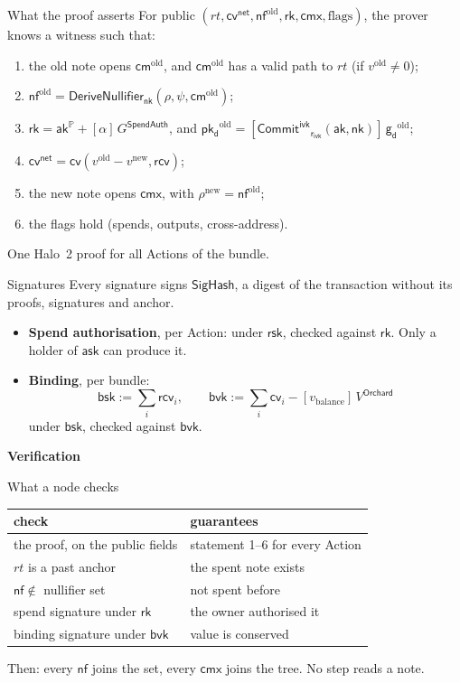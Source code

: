 \documentclass[aspectratio=169,11pt]{beamer}
\newcommand{\nfsym}{\ensuremath{\mathsf{nf}}}
\newcommand{\cmsym}{\ensuremath{\mathsf{cm}}}
\newcommand{\cmx}{\ensuremath{\mathsf{cmx}}}
\newcommand{\cvsym}{\ensuremath{\mathsf{cv}}}
\newcommand{\rksym}{\ensuremath{\mathsf{rk}}}
\newcommand{\gd}{\ensuremath{\mathsf{g_d}}}
\newcommand{\pkd}{\ensuremath{\mathsf{pk_d}}}
\newcommand{\aksym}{\ensuremath{\mathsf{ak}}}
\newcommand{\nksym}{\ensuremath{\mathsf{nk}}}
\newcommand{\asksym}{\ensuremath{\mathsf{ask}}}
\newcommand{\rcv}{\ensuremath{\mathsf{rcv}}}
\newcommand{\rivk}{\ensuremath{\mathsf{r_{ivk}}}}
\newcommand{\rsk}{\ensuremath{\mathsf{rsk}}}
\newcommand{\CommitIvk}{\ensuremath{\mathsf{Commit}^{\mathsf{ivk}}}}
\newcommand{\vbal}{\ensuremath{v_{\mathrm{balance}}}}
\newcommand{\divider}[1]{\begin{frame}[plain]\vfill\centering
  {\usebeamercolor[fg]{structure}\Huge\bfseries #1}\vfill\end{frame}}
\newcommand{\PP}{\mathbb{P}}
\newcommand{\akP}{\aksym^{\PP}}
\newcommand{\rk}{\rksym}
\newcommand{\DNf}{\mathsf{DeriveNullifier}}
\newcommand{\VO}{V^{\mathsf{Orchard}}}
\newcommand{\GS}{G^{\mathsf{SpendAuth}}}
\newcommand{\cvnet}{\cvsym^{\mathsf{net}}}
\begin{document}
\begin{frame}{What the proof asserts}
For public $(\mathit{rt}, \cvnet, \nfsym^{\mathrm{old}}, \rk, \cmx,
\text{flags})$,
the prover knows a witness such that:
\begin{enumerate}\itemsep3pt
\item the old note opens $\cmsym^{\mathrm{old}}$, and $\cmsym^{\mathrm{old}}$
  has a valid path to $\mathit{rt}$ (if $v^{\mathrm{old}} \ne 0$);
\item $\nfsym^{\mathrm{old}} = \DNf_{\nksym}(\rho, \psi,
  \cmsym^{\mathrm{old}})$;
\item $\rk = \akP + [\alpha]\,\GS$, and $\pkd^{\mathrm{old}} =
  [\CommitIvk_{\rivk}(\aksym, \nksym)]\,\gd^{\mathrm{old}}$;
\item $\cvnet = \cvsym(v^{\mathrm{old}} - v^{\mathrm{new}}, \rcv)$;
\item the new note opens $\cmx$, with $\rho^{\mathrm{new}} =
  \nfsym^{\mathrm{old}}$;
\item the flags hold (spends, outputs, cross-address).
\end{enumerate}
\vfill
One Halo~2 proof for all Actions of the bundle.
\end{frame}

\begin{frame}{Signatures}
Every signature signs $\mathsf{SigHash}$, a digest of the transaction
without its proofs, signatures and anchor.
\vfill
\begin{itemize}\itemsep8pt
\item \textbf{Spend authorisation}, per Action: under $\rsk$, checked
  against $\rk$. Only a holder of $\asksym$ can produce it.
\item \textbf{Binding}, per bundle:
\[
\mathsf{bsk} := \sum_i \rcv_i, \qquad
\mathsf{bvk} := \sum_i \cvsym_i - [\vbal]\,\VO
\]
  under $\mathsf{bsk}$, checked against $\mathsf{bvk}$.
\end{itemize}
\end{frame}

\divider{Verification}

\begin{frame}{What a node checks}
\begin{center}
\renewcommand{\arraystretch}{1.35}
\begin{tabular}{@{}ll@{}}
\toprule
check & guarantees \\
\midrule
the proof, on the public fields & statement 1--6 for every Action \\
$\mathit{rt}$ is a past anchor & the spent note exists \\
$\nfsym \notin$ nullifier set & not spent before \\
spend signature under $\rk$ & the owner authorised it \\
binding signature under $\mathsf{bvk}$ & value is conserved \\
\bottomrule
\end{tabular}
\end{center}
\vfill
Then: every $\nfsym$ joins the set, every $\cmx$ joins the tree. No step
reads a note.
\end{frame}
\end{document}
